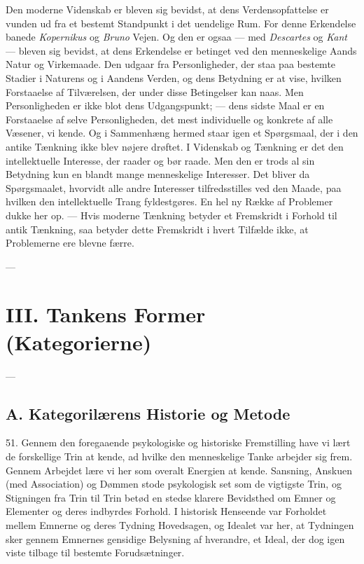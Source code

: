 \documentclass[12pt,a4paper]{book}
\newcommand{\opage}[1]{\marginnote{\footnotesize\textit{[#1]}}}
\begin{document}
\opage{134} Den moderne Videnskab er bleven sig bevidst, at dens
Verdensopfattelse er vunden ud fra et bestemt Standpunkt i det uendelige
Rum. For denne Erkendelse banede \emph{Kopernikus} og \emph{Bruno}
Vejen. Og den er ogsaa --- med \emph{Descartes} og \emph{Kant} --- bleven
sig bevidst, at dens Erkendelse er betinget ved den menneskelige Aands
Natur og Virkemaade. Den udgaar fra Personligheder, der staa paa bestemte
Stadier i Naturens og i Aandens Verden, og dens Betydning er at vise,
hvilken Forstaaelse af Tilværelsen, der under disse Betingelser kan naas.
Men Personligheden er ikke blot dens Udgangspunkt; --- dens sidste Maal
er en Forstaaelse af selve Personligheden, det mest individuelle og
konkrete af alle Væsener, vi kende. Og i Sammenhæng hermed staar igen et
Spørgsmaal, der i den antike Tænkning ikke blev nøjere drøftet. I
Videnskab og Tænkning er det den intellektuelle Interesse, der raader og
bør raade. Men den er trods al sin Betydning kun en blandt mange
menneskelige Interesser. Det bliver da Spørgsmaalet, hvorvidt alle andre
Interesser tilfredsstilles ved den Maade, paa hvilken den intellektuelle
Trang fyldestgøres. En hel ny Række af Problemer dukke her op. --- Hvis
moderne Tænkning betyder et Fremskridt i Forhold til antik Tænkning, saa
betyder dette Fremskridt i hvert Tilfælde ikke, at Problemerne ere blevne
færre.

\begin{center}---\end{center}

\opage{135} \chapter*{III. Tankens Former (Kategorierne)}
\label{ch:former}

\begin{center}---\end{center}

\section*{A. Kategorilærens Historie og Metode}
\label{sec:kategorilaere-historie}

51. Gennem den foregaaende psykologiske og historiske Fremstilling have
vi lært de forskellige Trin at kende, ad hvilke den menneskelige Tanke
arbejder sig frem. Gennem Arbejdet lære vi her som overalt Energien at
kende. Sansning, Anskuen (med Association) og Dømmen stode psykologisk
set som de vigtigste Trin, og Stigningen fra Trin til Trin betød en
stedse klarere Bevidsthed om Emner og Elementer og deres indbyrdes
Forhold. I historisk Henseende var Forholdet mellem Emnerne og deres
Tydning Hovedsagen, og Idealet var her, at Tydningen sker gennem
Emnernes gensidige Belysning af hverandre, et Ideal, der dog igen viste
tilbage til bestemte Forudsætninger.
\end{document}

